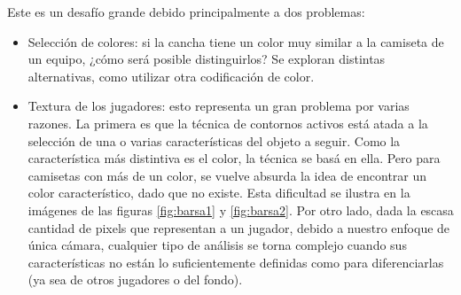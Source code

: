 Este es un desafío grande debido principalmente a dos problemas:
\begin{itemize}

\item Selección de colores: si la cancha tiene un color muy similar a la
  camiseta de un equipo, ¿cómo será posible distinguirlos? Se exploran
  distintas alternativas, como utilizar otra codificación de color.

\item Textura de los jugadores: esto representa un gran problema por varias
  razones. La primera es que la técnica de contornos activos está atada a la
  selección de una o varias características del objeto a seguir. Como la
  característica más distintiva es el color, la técnica se basá en ella. Pero
  para camisetas con más de un color, se vuelve absurda la idea de encontrar
  un color característico, dado que no existe.  Esta dificultad se ilustra en
  la imágenes de las figuras \ref{fig:barsa1} y \ref{fig:barsa2}. Por
  otro lado, dada la escasa cantidad de pixels que representan a un jugador,
  debido a nuestro enfoque de única cámara, cualquier tipo de análisis se torna
  complejo cuando sus características no están lo suficientemente definidas
  como para diferenciarlas (ya sea de otros jugadores o del fondo).

\end{itemize}

